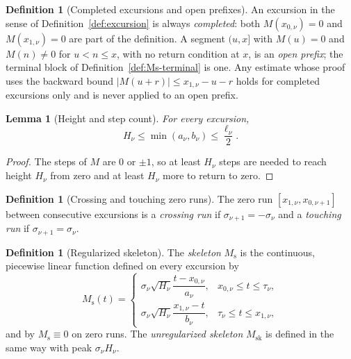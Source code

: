 \documentclass[11pt]{amsart}
\numberwithin{equation}{section}
\theoremstyle{plain}
\newtheorem{lemma}[theorem]{Lemma}
\theoremstyle{definition}
\newtheorem{definition}[theorem]{Definition}
\theoremstyle{remark}
\newcommand{\Ms}{M_{\mathrm{s}}}
\newcommand{\Msk}{M_{\mathrm{sk}}}
\begin{document}
\begin{definition}[Completed excursions and open prefixes]
\label{def:completed-open}
An excursion in the sense of Definition~\ref{def:excursion} is always
\emph{completed}: both $M(x_{0,\nu})=0$ and $M(x_{1,\nu})=0$ are part of
the definition. A segment $(u,x]$ with $M(u)=0$ and $M(n)\ne0$ for
$u<n\le x$, with no return condition at $x$, is an \emph{open prefix}; the
terminal block of Definition~\ref{def:Ms-terminal} is one. Any estimate
whose proof uses the backward bound $|M(u+r)|\le x_{1,\nu}-u-r$ holds for
completed excursions only and is never applied to an open prefix.
\end{definition}

\begin{lemma}[Height and step count]
\label{lem:height_steps}
For every excursion,
\begin{equation}
\label{eq:height_steps}
H_\nu\le\min(a_\nu,b_\nu)\le\frac{\ell_\nu}{2}.
\end{equation}
\end{lemma}

\begin{proof}
The steps of $M$ are $0$ or $\pm1$, so at least $H_\nu$ steps are needed to
reach height $H_\nu$ from zero and at least $H_\nu$ more to return to zero.
\end{proof}

\begin{definition}[Crossing and touching zero runs]
\label{def:crossing_touching}
The zero run $[x_{1,\nu},x_{0,\nu+1}]$ between consecutive excursions is a
\emph{crossing run} if $\sigma_{\nu+1}=-\sigma_\nu$ and a \emph{touching run}
if $\sigma_{\nu+1}=\sigma_\nu$.
\end{definition}

\begin{definition}[Regularized skeleton]
\label{def:Ms}
The \emph{skeleton} $\Ms$ is the continuous, piecewise linear function
defined on every excursion by
\begin{equation}
\label{eq:Ms_def}
\Ms(t)=
\begin{cases}
\sigma_\nu\sqrt{H_\nu}\dfrac{t-x_{0,\nu}}{a_\nu},
 &x_{0,\nu}\le t\le\tau_\nu,\\[2ex]
\sigma_\nu\sqrt{H_\nu}\dfrac{x_{1,\nu}-t}{b_\nu},
 &\tau_\nu\le t\le x_{1,\nu},
\end{cases}
\end{equation}
and by $\Ms\equiv0$ on zero runs. The \emph{unregularized skeleton} $\Msk$
is defined in the same way with peak $\sigma_\nu H_\nu$.
\end{definition}
\end{document}
